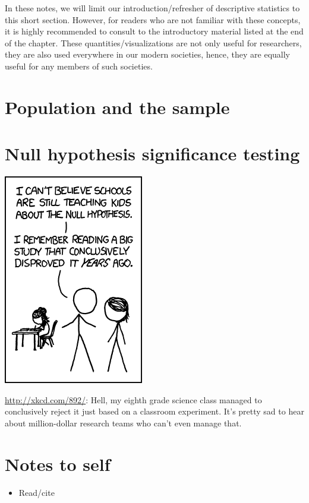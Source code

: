 In these notes,
we will limit our introduction/refresher of descriptive statistics 
to this short section.
However,
for readers who are not familiar with these concepts,
it is highly recommended to consult to the introductory material listed
at the end of the chapter.
These quantities/visualizations are not only useful for researchers,
they are also used everywhere in our modern societies,
hence, they are equally useful for any members of such societies.

\section{Population and the sample}


\section{Null hypothesis significance testing}

\begin{marginfigure}
  \includegraphics[width=\linewidth]{figures/xkcd-null_hypothesis}
  \caption{\url{http://xkcd.com/892/}: 
    Hell, my eighth grade science class managed to
    conclusively reject it just based on a classroom experiment.
    It's pretty sad to hear about million-dollar research teams
    who can't even manage that.
  }
\end{marginfigure}


\section*{Notes to self}

\begin{itemize}
  \item Read/cite \textcite{gigerenzer2007}
\end{itemize}
